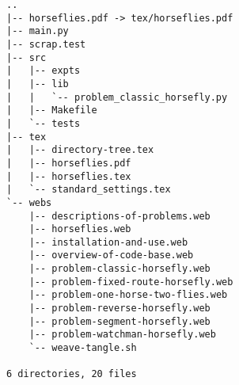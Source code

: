 \begin{verbatim}
..
|-- horseflies.pdf -> tex/horseflies.pdf
|-- main.py
|-- scrap.test
|-- src
|   |-- expts
|   |-- lib
|   |   `-- problem_classic_horsefly.py
|   |-- Makefile
|   `-- tests
|-- tex
|   |-- directory-tree.tex
|   |-- horseflies.pdf
|   |-- horseflies.tex
|   `-- standard_settings.tex
`-- webs
    |-- descriptions-of-problems.web
    |-- horseflies.web
    |-- installation-and-use.web
    |-- overview-of-code-base.web
    |-- problem-classic-horsefly.web
    |-- problem-fixed-route-horsefly.web
    |-- problem-one-horse-two-flies.web
    |-- problem-reverse-horsefly.web
    |-- problem-segment-horsefly.web
    |-- problem-watchman-horsefly.web
    `-- weave-tangle.sh

6 directories, 20 files
\end{verbatim}
